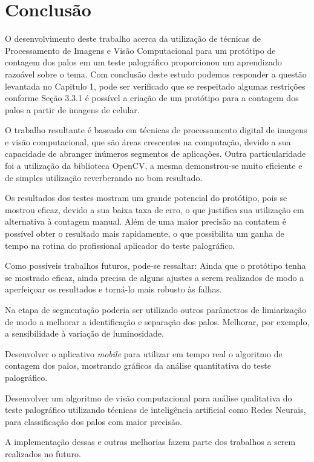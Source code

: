  \chapter{Conclusão}
\label{cap:conclu}

O desenvolvimento deste trabalho acerca da utilização de técnicas de Processamento de Imagens e Visão Computacional para um protótipo de contagem dos palos em um teste palográfico proporcionou um aprendizado razoável sobre o tema.  Com conclusão deste estudo podemos responder a questão levantada no Capitulo 1, pode ser verificado que se respeitado algumas restrições conforme Seção 3.3.1 é possível a criação de um protótipo para a contagem dos palos a partir de imagens de celular.

O trabalho resultante é baseado em técnicas de processamento digital de imagens e visão computacional, que são áreas crescentes na computação, devido a sua capacidade de abranger inúmeros segmentos de aplicações. Outra particularidade foi a utilização da biblioteca OpenCV, a mesma demonstrou-se muito eficiente e de simples utilização reverberando no bom resultado.

Os resultados dos testes mostram um grande potencial do protótipo, pois se mostrou eficaz, devido a sua baixa taxa de erro, o que justifica sua utilização em alternativa à contagem manual.  Além de uma maior precisão na contatem é possível obter o resultado mais rapidamente, o que possibilita um ganha de tempo na rotina do profissional aplicador do teste palográfico.

Como possíveis trabalhos futuros, pode-se ressaltar:
Ainda que o protótipo tenha se mostrado eficaz, ainda precisa de alguns ajustes a serem realizados de modo a aperfeiçoar os resultados e torná-lo mais robusto às falhas.

Na etapa de segmentação poderia ser utilizado outros parâmetros de limiarização de modo a melhorar a identificação e separação dos palos. Melhorar, por exemplo, a sensibilidade à variação de luminosidade.

Desenvolver o aplicativo \textit{mobile} para utilizar em tempo real o algoritmo de contagem dos palos, mostrando gráficos da análise quantitativa do teste palográfico.

Desenvolver um algoritmo de visão computacional para análise qualitativa do teste palográfico utilizando técnicas de inteligência artificial como Redes Neurais, para classificação dos palos com maior precisão.

A implementação dessas e outras melhorias fazem parte dos trabalhos a serem realizados no futuro.








